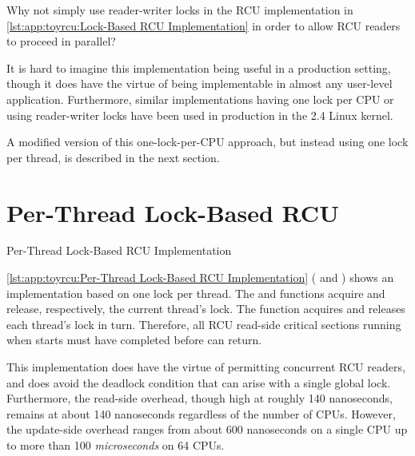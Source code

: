 \QuickQuiz{}
	Why not simply use reader-writer locks in the RCU implementation
	in
	\cref{lst:app:toyrcu:Lock-Based RCU Implementation}
	in order to allow RCU readers to proceed in parallel?
 \QuickQuizEnd

It is hard to imagine this implementation being useful
in a production setting, though it does have the virtue
of being implementable in almost any user-level application.
Furthermore, similar implementations having one lock per CPU
or using reader-writer locks have been used in production
in the 2.4 Linux kernel.

A modified version of this one-lock-per-CPU approach, but instead using
one lock per thread, is described
in the next section.

\section{Per-Thread Lock-Based RCU}
\label{sec:app:toyrcu:Per-Thread Lock-Based RCU}

\begin{listing}[tbp]
\vspace*{-11pt}
\caption{Per-Thread Lock-Based RCU Implementation}
\label{lst:app:toyrcu:Per-Thread Lock-Based RCU Implementation}
\end{listing}

\cref{lst:app:toyrcu:Per-Thread Lock-Based RCU Implementation}
( and )
shows an implementation based on one lock per thread.
The  and  functions
acquire and release, respectively, the current thread's lock.
The  function acquires and releases each thread's
lock in turn.
Therefore, all RCU read-side critical sections running
when  starts must have completed before
 can return.

This implementation does have the virtue of permitting concurrent
RCU readers, and does avoid the deadlock condition that can arise
with a single global lock.
Furthermore, the read-side overhead, though high at roughly 140 nanoseconds,
remains at about 140 nanoseconds regardless of the number of CPUs.
However, the update-side overhead ranges from about 600 nanoseconds
on a single  CPU
up to more than 100 \emph{microseconds} on 64 CPUs.

